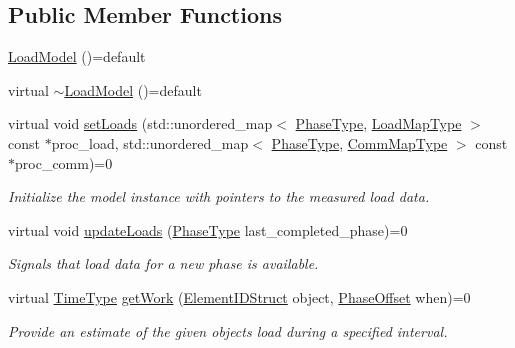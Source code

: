 \subsection*{Public Member Functions}
\begin{DoxyCompactItemize}
\item 
\hyperlink{structvt_1_1vrt_1_1collection_1_1balance_1_1_load_model_a90f345e752441d66b2893027f2626226}{Load\+Model} ()=default
\item 
virtual \hyperlink{structvt_1_1vrt_1_1collection_1_1balance_1_1_load_model_a6478a387f285b322a48ee1d8a80fc6f7}{$\sim$\+Load\+Model} ()=default
\item 
virtual void \hyperlink{structvt_1_1vrt_1_1collection_1_1balance_1_1_load_model_a07512b8d95025a21a7c25cc3fdb817ad}{set\+Loads} (std\+::unordered\+\_\+map$<$ \hyperlink{namespacevt_a46ce6733d5cdbd735d561b7b4029f6d7}{Phase\+Type}, \hyperlink{namespacevt_1_1vrt_1_1collection_1_1balance_a5339303db2e1ce964d783a53fd74e6b1}{Load\+Map\+Type} $>$ const $\ast$proc\+\_\+load, std\+::unordered\+\_\+map$<$ \hyperlink{namespacevt_a46ce6733d5cdbd735d561b7b4029f6d7}{Phase\+Type}, \hyperlink{namespacevt_1_1vrt_1_1collection_1_1balance_a10860c956804d644db54a16012352728}{Comm\+Map\+Type} $>$ const $\ast$proc\+\_\+comm)=0
\begin{DoxyCompactList}\small\item\em Initialize the model instance with pointers to the measured load data. \end{DoxyCompactList}\item 
virtual void \hyperlink{structvt_1_1vrt_1_1collection_1_1balance_1_1_load_model_a4f1c6fb5d7d7a0b147755f025b1d5f5c}{update\+Loads} (\hyperlink{namespacevt_a46ce6733d5cdbd735d561b7b4029f6d7}{Phase\+Type} last\+\_\+completed\+\_\+phase)=0
\begin{DoxyCompactList}\small\item\em Signals that load data for a new phase is available. \end{DoxyCompactList}\item 
virtual \hyperlink{namespacevt_a876a9d0cd5a952859c72de8a46881442}{Time\+Type} \hyperlink{structvt_1_1vrt_1_1collection_1_1balance_1_1_load_model_a430980cf8970bb3bf2b35d7ccf18799d}{get\+Work} (\hyperlink{structvt_1_1vrt_1_1collection_1_1balance_1_1_element_i_d_struct}{Element\+I\+D\+Struct} object, \hyperlink{structvt_1_1vrt_1_1collection_1_1balance_1_1_phase_offset}{Phase\+Offset} when)=0
\begin{DoxyCompactList}\small\item\em Provide an estimate of the given object\textquotesingle{}s load during a specified interval. \end{DoxyCompactList}\item 

\end{DoxyCompactItemize}
